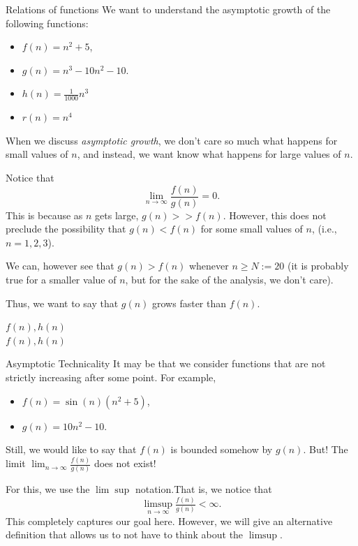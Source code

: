 \begin{example}{Relations of functions}{}
We want to understand the asymptotic growth of the following functions:
\begin{itemize}
\item $f(n) = n^2 + 5$,
\item $g(n) = n^3 - 10n^2 -10$.
\item $h(n) = \tfrac{1}{1000}n^3$
\item $r(n) = n^4$
\end{itemize}

When we discuss \emph{asymptotic growth}, we don't care so much what happens for small values of $n$, and instead, we want know what happens for large values of $n$.

Notice that 
\begin{equation}
\lim_{n \to \infty} \frac{f(n)}{g(n)} = 0.
\end{equation}
This is because as $n$ gets large, $g(n) >> f(n)$.  However, this does not preclude the possibility that $g(n) < f(n)$ for some small values of $n$, (i.e., $n=1,2,3$).

We can, however see that $g(n) > f(n)$ whenever $n \geq N:= 20$ (it is probably true for a smaller value of $n$, but for the sake of the analysis, we don't care).

Thus, we want to say that $g(n)$ grows faster than $f(n)$.

\noindent \textbf{$f(n), h(n)$}\\
%
%
%
\noindent \textbf{$f(n), h(n)$}\\
%
%
%
%
\end{example}

\begin{example}{Asymptotic Technicality}{}
It may be that we consider functions that are not strictly increasing after some point.  For example,
\begin{itemize}
\item $f(n) = \sin(n)(n^2 + 5)$,
\item $g(n) = 10n^2 -10$.
\end{itemize}

Still, we would like to say that $f(n)$ is bounded somehow by $g(n)$.  But!   The limit $\lim_{n \to \infty} \tfrac{f(n)}{g(n)}$ does not exist!

For this, we use the $\lim\sup$ notation.That is, we notice that 
\begin{equation}
\limsup_{n\to \infty} \tfrac{f(n)}{g(n)} < \infty.
\end{equation}
This completely captures our goal here.  However, we will give an alternative definition that allows us to not have to think about the $\limsup$.
\end{example}

